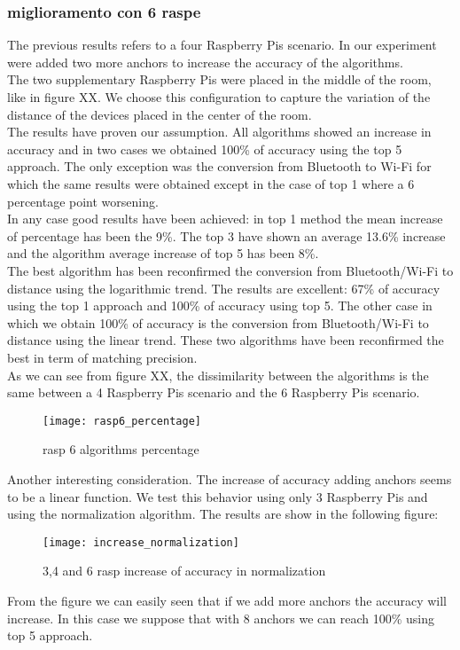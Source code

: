 \subsubsection{miglioramento con 6 raspe}
The previous results refers to a four Raspberry Pis scenario. In our experiment were added two more anchors to increase the accuracy of the algorithms.\\
The two supplementary Raspberry Pis were placed in the middle of the room, like in figure XX. We choose this configuration to capture the variation of the distance of the devices placed in the center of the room. \\
\linebreak
The results have proven our assumption. All algorithms showed an increase in accuracy and in two cases we obtained 100\% of accuracy using the top 5 approach. The only exception was the conversion from Bluetooth to Wi-Fi for which the same results were obtained except in the case of top 1 where a 6 percentage point worsening.\\
In any case good results have been achieved: in top 1 method the mean increase of percentage has been the 9\%. The top 3 have shown an average 13.6\% increase and the algorithm average increase of top 5 has been 8\%.\\
\linebreak
The best algorithm has been reconfirmed the conversion from Bluetooth/Wi-Fi to distance using the logarithmic trend. The results are excellent: 67\% of accuracy using the top 1 approach and 100\% of accuracy using top 5. The other case in which we obtain 100\% of accuracy is the conversion from Bluetooth/Wi-Fi to distance using the linear trend. These two algorithms have been reconfirmed the best in term of matching precision.\\
\linebreak
As we can see from figure XX, the dissimilarity between the algorithms is the same between a 4 Raspberry Pis scenario and the 6 Raspberry Pis scenario.
\begin{figure}[H]
\centering
\texttt{[image: rasp6\_percentage]}
\caption{rasp 6 algorithms percentage}
\end{figure}
Another interesting consideration. The increase of accuracy adding anchors seems to be a linear function. We test this behavior using only 3 Raspberry Pis and using the normalization algorithm. The results are show in the following figure:
\begin{figure}[H]
\centering
\texttt{[image: increase\_normalization]}
\caption{3,4 and 6 rasp increase of accuracy in normalization}
\end{figure}
From the figure we can easily seen that if we add more anchors the accuracy will increase. In this case we suppose that with 8 anchors we can reach 100\% using top 5 approach.
